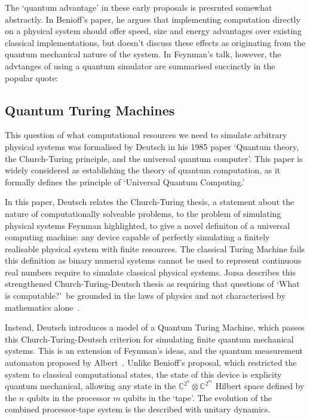 \documentclass{standalone}
\begin{document}
\par
The `quantum advantage' in these early proposals is presrnted somewhat abstractly. In Benioff's paper, he argues that implementing computation directly on a physical system should offer speed, size and energy advantages over existing classical implementations, but doesn't discuss these effects as originating from the quantum mechanical nature of the system. In Feynman's talk, however, the advtanges of using a quantum simulator are summarised succinctly in the popular quote:
\par

\subsection{Quantum Turing Machines}\label{sec:QTM}
This question of what computational resources we need to simulate arbitrary physical systems was formalised by Deutsch in his 1985 paper `Quantum theory, the Church-Turing principle, and the universal quantum computer'. This paper is widely considered as establishing the theory of quantum computation, as it formally defines the principle of `Universal Quantum Computing.' 
\par
In this paper, Deutsch relates the Church-Turing thesis, a statement about the nature of computationally solveable problems, to the problem of simulating physical systems Feynman highlighted, to give a novel definiton of a universal computing machine: any device capable of perfectly simulating a finitely realisable physical system with finite resources. The classical Turing Machine fails this definition as binary numeral systems cannot be used to represent continuous real numbers require to simulate classical physical systems. Jozsa describes this strengthened Church-Turing-Deutsch thesis as requiring that questions of `What is computable?'\ be grounded in the laws of physics and not characterised by mathematics alone~\cite{Jozsa1997}.
\par
Instead, Deutsch introduces a model of a Quantum Turing Machine, which passes this Church-Turing-Deutsch criterion for simulating finite quantum mechanical systems. This is an extension of Feynman's ideas, and the quantum measurement automaton proposed by Albert~\cite{Albert1983}. Unlike Benioff's proposal, which restricted the system to classical computational states, the state of this device is explicity quantum mechanical, allowing any state in the $\mathbb{C}^{2^{n}} \otimes \mathbb{C}^{2^{m}}$ Hilbert space defined by the $n$ qubits in the processor $m$ qubits in the `tape'. The evolution of the combined processor-tape system is the described with unitary dynamics. 
\end{document}
